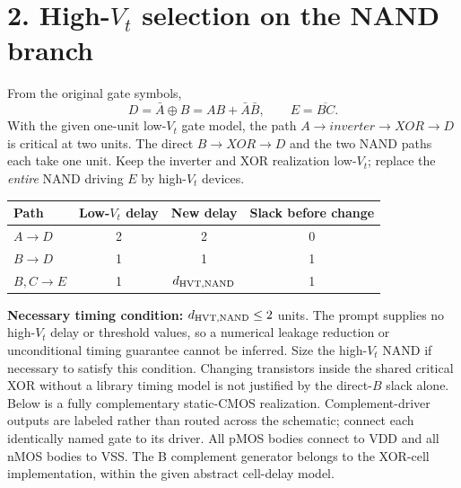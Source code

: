 \documentclass[11pt,a4paper]{article}
\begin{document}
\newpage
\section*{2. High-$V_t$ selection on the NAND branch}
From the original gate symbols,
\[
 D=\bar A\oplus B=AB+\bar A\bar B,\qquad E=\overline{BC}.
\]
With the given one-unit low-$V_t$ gate model, the path $A\to inverter\to XOR\to D$ is critical at two units. The direct $B\to XOR\to D$ and the two NAND paths each take one unit. Keep the inverter and XOR realization low-$V_t$; replace the \emph{entire} NAND driving $E$ by high-$V_t$ devices.
\begin{center}\begin{tabular}{lccc}\toprule
Path&Low-$V_t$ delay&New delay&Slack before change\\\midrule
$A\to D$&2&2&0\\$B\to D$&1&1&1\\$B,C\to E$&1&$d_{\rm HVT,NAND}$&1\\\bottomrule
\end{tabular}\end{center}
\textbf{Necessary timing condition:} $d_{\rm HVT,NAND}\le 2$ units. The prompt supplies no high-$V_t$ delay or threshold values, so a numerical leakage reduction or unconditional timing guarantee cannot be inferred. Size the high-$V_t$ NAND if necessary to satisfy this condition. Changing transistors inside the shared critical XOR without a library timing model is not justified by the direct-$B$ slack alone.
Below is a fully complementary static-CMOS realization. Complement-driver outputs are labeled rather than routed across the schematic; connect each identically named gate to its driver. All pMOS bodies connect to VDD and all nMOS bodies to VSS. The B complement generator belongs to the XOR-cell implementation, within the given abstract cell-delay model.
\end{document}

